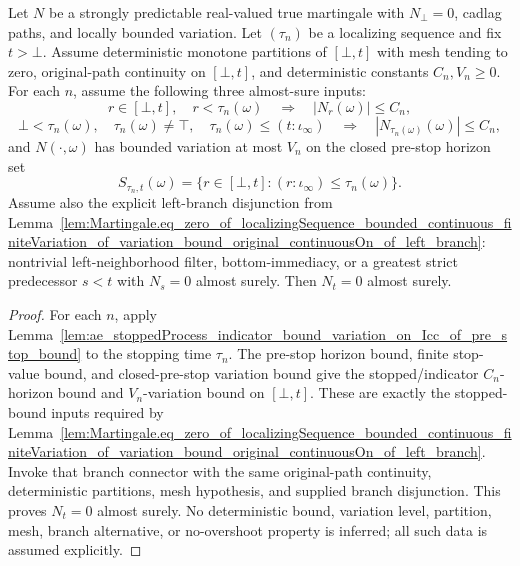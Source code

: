 \begin{lemma}\label{lem:Martingale.eq_zero_of_localizingSequence_of_pre_stop_bound_variation_bound_original_continuousOn_of_left_branch}
Let \(N\) be a strongly predictable real-valued true martingale with
\(N_\bot=0\), cadlag paths, and locally bounded variation.  Let
\((\tau_n)\) be a localizing sequence and fix \(t>\bot\).  Assume deterministic
monotone partitions of \([\bot,t]\) with mesh tending to zero, original-path
continuity on \([\bot,t]\), and deterministic constants \(C_n,V_n\ge0\).
For each \(n\), assume the following three almost-sure inputs:
\[
  r\in[\bot,t],\quad r<\tau_n(\omega)
  \quad\Longrightarrow\quad
  |N_r(\omega)|\le C_n,
\]
\[
  \bot<\tau_n(\omega),\quad \tau_n(\omega)\ne\top,\quad
  \tau_n(\omega)\le (t:\iota_\infty)
  \quad\Longrightarrow\quad
  |N_{\tau_n(\omega)}(\omega)|\le C_n,
\]
and \(N(\cdot,\omega)\) has bounded variation at most \(V_n\) on the closed
pre-stop horizon set
\[
  S_{\tau_n,t}(\omega)
  =
  \{r\in[\bot,t] : (r:\iota_\infty)\le \tau_n(\omega)\}.
\]
Assume also the explicit left-branch disjunction from
Lemma~\ref{lem:Martingale.eq_zero_of_localizingSequence_bounded_continuous_finiteVariation_of_variation_bound_original_continuousOn_of_left_branch}:
nontrivial left-neighborhood filter, bottom-immediacy, or a greatest strict
predecessor \(s<t\) with \(N_s=0\) almost surely.  Then \(N_t=0\) almost surely.
\end{lemma}

\begin{proof}
For each \(n\), apply
Lemma~\ref{lem:ae_stoppedProcess_indicator_bound_variation_on_Icc_of_pre_stop_bound}
to the stopping time \(\tau_n\).  The pre-stop horizon bound, finite
stop-value bound, and closed-pre-stop variation bound give the stopped/indicator
\(C_n\)-horizon bound and \(V_n\)-variation bound on \([\bot,t]\).  These are
exactly the stopped-bound inputs required by
Lemma~\ref{lem:Martingale.eq_zero_of_localizingSequence_bounded_continuous_finiteVariation_of_variation_bound_original_continuousOn_of_left_branch}.
Invoke that branch connector with the same original-path continuity,
deterministic partitions, mesh hypothesis, and supplied branch disjunction.
This proves \(N_t=0\) almost surely.  No deterministic bound, variation level,
partition, mesh, branch alternative, or no-overshoot property is inferred; all
such data is assumed explicitly.
\end{proof}

